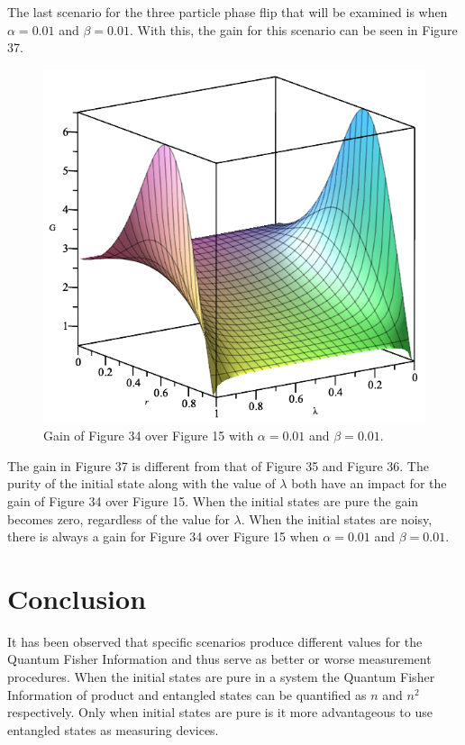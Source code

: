 \documentclass[twocolumn]{article}
\begin{document}
The last scenario for the three particle phase flip that will be examined is when $\alpha=0.01$ and $\beta=0.01$. With this, the gain for this scenario can be seen in Figure 37.
\begin{figure}[h]
\begin{center}
\includegraphics[width=0.65\linewidth]{Phase-Flip-Triple-Channel-Alpha=001-Beta=001-Gain-Graph.png}
\caption{Gain of Figure 34 over Figure 15 with $\alpha=0.01$ and $\beta=0.01$.}
\end{center}
\end{figure}
\newline
The gain in Figure 37 is different from that of Figure 35 and Figure 36. The purity of the initial state along with the value of $\lambda$ both have an impact for the gain of Figure 34 over Figure 15. When the initial states are pure the gain becomes zero, regardless of the value for $\lambda$. When the initial states are noisy, there is always a gain for Figure 34 over Figure 15 when $\alpha=0.01$ and $\beta=0.01$.
\section*{Conclusion}
It has been observed that specific scenarios produce different values for the Quantum Fisher Information and thus serve as better or worse measurement procedures. When the initial states are pure in a system the Quantum Fisher Information of product and entangled states can be quantified as $n$ and $n^2$ respectively. Only when initial states are pure is it more advantageous to use entangled states as measuring devices.
\end{document}
